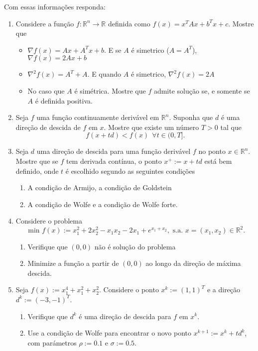 \documentclass[a4paper,latin]{article}
\begin{document}
 Com essas informações responda:
    \begin{enumerate}
    \item Considere a função 
    $f: \mathbb{R}^{n}\rightarrow \mathbb{R}$ definida como 
    $f(x)=x^{T}Ax+b^{T}x+c$.
    Mostre que 
      \begin{itemize}
      \item  $\nabla f(x)=Ax+A^{T}x+b$.
      E se $A$ é simetrico ($A=A^{T}$), $\nabla f(x)=2Ax+b$
      \item  $\nabla^{2} f(x)= A^{T}+A$.
      E quando $A$ é simetrico,
      $\nabla^{2} f(x)=2A$ 
      \item No caso que $A$ é simétrica. 
      Mostre que $f$ admite solução se, e somente se $A$ é definida positiva. 
      \end{itemize}
   \item Seja $f$ uma função 
   continuamente derivável em $\mathbb{R}^{n}$.
   Suponha que $d$ é uma direção de descida de $f$ em $x$.
   Mostre que existe um número $T>0$ tal que 
   $$f(x+td)<f(x) \ \ \forall t \in (0,T].$$
   \item Seja $d$ uma direção de descida para uma função derivável $f$
   no ponto $x \in \mathbb{R}^{n}$. 
   Mostre que se $f$ tem derivada contínua, o ponto $x^{+}:=x+td$ está bem definido, onde $t$ é escolhido 
   segundo as seguintes condições 
        \begin{enumerate}
        \item A condição de Armijo, a condição de Goldstein
        \item A condição de Wolfe e a condição de Wolfe forte.
        \end{enumerate}
    \item Considere o problema 
    $$ \text{ min } f(x):=x_1^{2}+2x_2^{2}-x_1x_2-2x_1+e^{x_1+x_2}, 
    \text{ s.a. } x=(x_1,x_2) \in \mathbb{R}^2.$$
      \begin{enumerate}
      \item Verifique que $(0,0)$ não é solução do problema
      \item Minimize a função a partir de $(0,0)$ ao 
      longo da direção de máxima descida.
      \end{enumerate}  
    \item Seja $f(x):=x_1^{4}+x_1^{2}+x_2^{2}$. Considere o 
    ponto $x^{k}:=(1,1)^{T}$ e a direção $d^{k}:=(-3,-1)^{T}$.
     \begin{enumerate}
     \item Verifique que $d^{k}$ 
     é uma direção de descida para $f$ em $x^k$.
     \item Use a condição de Wolfe para encontrar o novo ponto 
     $x^{k+1}:=x^{k}+td^{k}$, com parámetros $\rho:=0.1$ e $\sigma:=0.5$.
     

\end{enumerate}
\end{enumerate}
\end{document}
